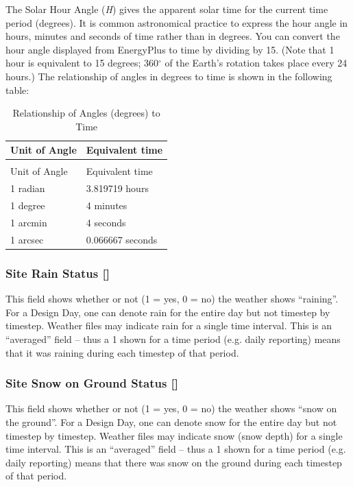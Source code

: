 The Solar Hour Angle (\emph{H}) gives the apparent solar time for the current time period (degrees). It is common astronomical practice to express the hour angle in hours, minutes and seconds of time rather than in degrees. You can convert the hour angle displayed from EnergyPlus to time by dividing by 15. (Note that 1 hour is equivalent to 15 degrees; 360$^\circ$ of the Earth's rotation takes place every 24 hours.) The relationship of angles in degrees to time is shown in the following table:

\begin{longtable}[c]{@{}ll@{}}
\caption{Relationship of Angles (degrees) to Time \label{table:relationship-of-angles-degrees-to-time}} \tabularnewline
\toprule
Unit of Angle & Equivalent time \tabularnewline
\midrule
\endfirsthead

\caption[]{Relationship of Angles (degrees) to Time} \tabularnewline
\toprule
Unit of Angle & Equivalent time \tabularnewline
\midrule
\endhead

1 radian & 3.819719 hours \tabularnewline
1 degree & 4 minutes \tabularnewline
1 arcmin & 4 seconds \tabularnewline
1 arcsec & 0.066667 seconds \tabularnewline
\bottomrule
\end{longtable}

\subsubsection{Site Rain Status {[]}}\label{site-rain-status}

This field shows whether or not (1 = yes, 0 = no) the weather shows ``raining''. For a Design Day, one can denote rain for the entire day but not timestep by timestep. Weather files may indicate rain for a single time interval. This is an ``averaged'' field -- thus a 1 shown for a time period (e.g. daily reporting) means that it was raining during each timestep of that period.

\subsubsection{Site Snow on Ground Status {[]}}\label{site-snow-on-ground-status}

This field shows whether or not (1 = yes, 0 = no) the weather shows ``snow on the ground''. For a Design Day, one can denote snow for the entire day but not timestep by timestep. Weather files may indicate snow (snow depth) for a single time interval. This is an ``averaged'' field -- thus a 1 shown for a time period (e.g. daily reporting) means that there was snow on the ground during each timestep of that period.

